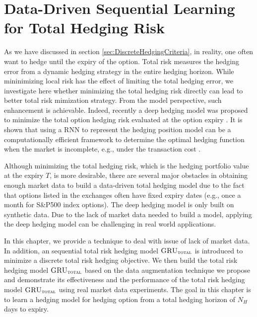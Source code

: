 \documentclass[letterpaper,12pt,titlepage,oneside,final]{book}
\numberwithin{equation}{section}
\theoremstyle{definition}
\newcommand{\modelT}{\textsc{GRU}_{\textsc{total}}}
\begin{document}
\iffalse


\chapter{Data-Driven Sequential Learning  for Total Hedging Risk}
\label{sec:RNNTotal}
As we have discussed in section \ref{sec:DiscreteHedgingCriteria}, in reality, one often want to hedge until the expiry of the option. Total risk measures the hedging error from a dynamic hedging strategy in the entire hedging horizon. While mininimizing local risk has the effect of limiting the total hedging error, we investigate here whether minimizing the total hedging risk directly can lead to better total risk mimization strategy. From the model perspective, such enhancement is achievable. Indeed, recently a deep hedging model was proposed to minimize the total option hedging risk evaluated at the option expiry  \citep{buehler2019deep}. It is shown  that using a RNN to represent the hedging position model can be a computationally efficient framework to determine the optimal hedging function when the market is incomplete, e.g., under the transaction cost \citep{buehler2019deep}.

Although minimizing the total hedging risk, which is  the hedging portfolio value at the expiry $T$, is more desirable, there are several major obstacles in obtaining enough market data to build a data-driven total hedging model due to the fact that options listed in the exchanges often have fixed expiry dates (e.g., once a month for S\&P500 index options). The deep hedging model \citep{buehler2019deep} is only built on synthetic data. Due to the lack of market data needed to build a  model, applying the  deep hedging model \citep{buehler2019deep} can be challenging in real world applications.

In this chapter, we  provide a technique to deal with issue of lack of market data. In addition, an   sequential total risk hedging model $\modelT$ is introduced to minimize a discrete total risk hedging objective. We then build the total risk hedging model $\modelT$ based on the data augmentation technique we propose and demonstrate its effectiveness  and the performance of  the  total risk hedging model $\modelT$ using real market data experiments.  The goal in this chapter is to learn a hedging model for hedging option from a total hedging horizon of $N_H$ days to expiry. 
\end{document}
